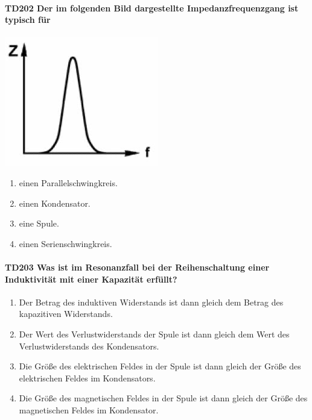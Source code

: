 \documentclass[8pt]{article}
\begin{document}
\begin{enumerate}
\begin{enumerate}[nolistsep,label=\Alph*]
{\paragraph*{TD202 Der im folgenden Bild dargestellte Impedanzfrequenzgang ist typisch für}
\begin{center}
	\begin{minipage}{\linewidth}
		\centering
		\includegraphics[scale=1.0]{pics/td202_a.jpg}
	\end{minipage}
\end{center}
\begin{enumerate}[nolistsep,label=\Alph*]
\item einen Parallelschwingkreis.
\item einen Kondensator.
\item eine Spule.
\item einen Serienschwingkreis.
\end{enumerate}

\paragraph*{TD203 Was ist im Resonanzfall bei der Reihenschaltung einer Induktivität mit einer Kapazität erfüllt?}
\begin{enumerate}[nolistsep,label=\Alph*]
\item Der Betrag des induktiven Widerstands ist dann gleich dem Betrag des kapazitiven Widerstands. 
\item Der Wert des Verlustwiderstands der Spule ist dann gleich dem Wert des Verlustwiderstands des Kondensators.
\item Die Größe des elektrischen Feldes in der Spule ist dann gleich der Größe des elektrischen Feldes im Kondensators.
\item Die Größe des magnetischen Feldes in der Spule ist dann gleich der Größe des magnetischen Feldes im Kondensator.
\end{enumerate}

}
\end{enumerate}
\end{enumerate}
\end{document}
